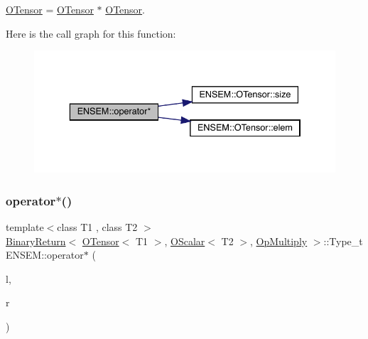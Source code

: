 \mbox{\hyperlink{classENSEM_1_1OTensor}{O\+Tensor}} = \mbox{\hyperlink{classENSEM_1_1OTensor}{O\+Tensor}} $\ast$ \mbox{\hyperlink{classENSEM_1_1OTensor}{O\+Tensor}}. 

Here is the call graph for this function\+:\nopagebreak
\begin{figure}[H]
\begin{center}
\leavevmode
\includegraphics[width=336pt]{de/d87/group__obstensor_ga45559bd4234015a910a92c2eb80a69d5_cgraph}
\end{center}
\end{figure}
\mbox{\label{group__obstensor_gad60dc9814d8cddbdf21babfd0bff14c4}} 
\subsubsection{\texorpdfstring{operator$\ast$()}{operator*()}\hspace{0.1cm}{\footnotesize\ttfamily [2/3]}}
{\footnotesize\ttfamily template$<$class T1 , class T2 $>$ \\
\mbox{\hyperlink{structENSEM_1_1BinaryReturn}{Binary\+Return}}$<$ \mbox{\hyperlink{classENSEM_1_1OTensor}{O\+Tensor}}$<$ T1 $>$, \mbox{\hyperlink{classENSEM_1_1OScalar}{O\+Scalar}}$<$ T2 $>$, \mbox{\hyperlink{structENSEM_1_1OpMultiply}{Op\+Multiply}} $>$\+::Type\+\_\+t E\+N\+S\+E\+M\+::operator$\ast$ (\begin{DoxyParamCaption}\item[{const \mbox{\hyperlink{classENSEM_1_1OTensor}{O\+Tensor}}$<$ T1 $>$ \&}]{l,  }\item[{const \mbox{\hyperlink{classENSEM_1_1OScalar}{O\+Scalar}}$<$ T2 $>$ \&}]{r }\end{DoxyParamCaption})\hspace{0.3cm}{\ttfamily [inline]}}




